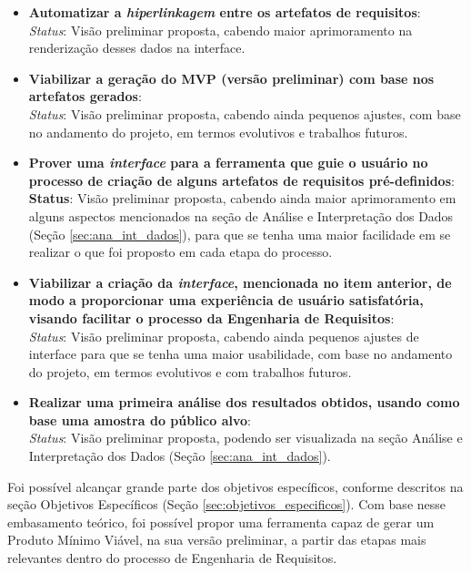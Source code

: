 \begin{itemize}
    \item \textbf{Automatizar a \textit{hiperlinkagem} entre os artefatos de requisitos}:\\
    \textit{Status}: Visão preliminar proposta, cabendo maior aprimoramento na renderização desses dados na interface. \\
    \item \textbf{Viabilizar a geração do MVP (versão preliminar) com base nos artefatos gerados}:\\
    \textit{Status}: Visão preliminar proposta, cabendo ainda pequenos ajustes, com base no andamento do projeto, em termos evolutivos e trabalhos futuros.
    \item \textbf{Prover uma \textit{interface} para a ferramenta que guie o usuário no processo de criação de alguns artefatos de requisitos pré-definidos}:\\
    \textbf{Status}: Visão preliminar proposta, cabendo ainda maior aprimoramento em alguns aspectos mencionados na seção de Análise e Interpretação dos Dados  (Seção \ref{sec:ana_int_dados}), para que se tenha uma maior facilidade em se realizar o que foi proposto em cada etapa do processo.
    \item  \textbf{Viabilizar a criação da \textit{interface}, mencionada no item anterior, de modo a proporcionar uma experiência de usuário satisfatória, visando facilitar o processo da Engenharia de Requisitos}:\\
    \textit{Status}: Visão preliminar proposta, cabendo ainda pequenos ajustes de interface para que se tenha uma maior usabilidade, com base no andamento do projeto, em termos evolutivos e com trabalhos futuros.
    \item  \textbf{Realizar uma primeira análise dos resultados obtidos, usando como base uma amostra do público alvo}:\\
    \textit{Status}: Visão preliminar proposta, podendo ser visualizada na seção Análise e Interpretação dos Dados (Seção \ref{sec:ana_int_dados}).
\end{itemize}

Foi possível alcançar grande parte dos objetivos específicos, conforme descritos na seção Objetivos Específicos (Seção \ref{sec:objetivos_especificos}). Com base nesse embasamento teórico, foi possível propor uma ferramenta capaz de gerar um Produto Mínimo Viável, na sua versão preliminar, a partir das etapas mais relevantes dentro do processo de Engenharia de Requisitos.

